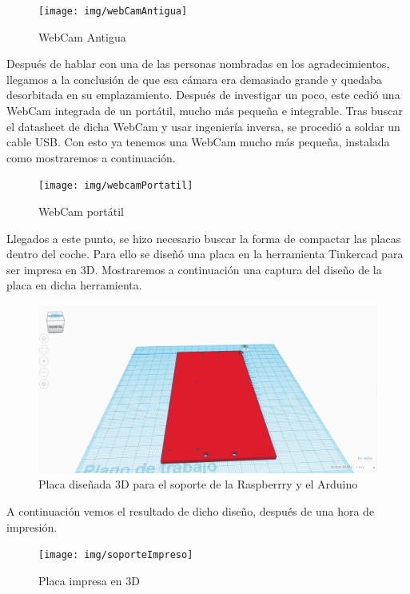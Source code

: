 \documentclass{pclass}
\begin{document}
\begin{itemize}
\begin{figure}[H]
	\centering
	\texttt{[image: img/webCamAntigua]}
	\caption{WebCam Antigua}
	\label{fig:webcamvieja}
\end{figure}

Después de hablar con una de las personas nombradas en los agradecimientos, llegamos a la conclusión de que esa cámara era demasiado grande y quedaba desorbitada en su emplazamiento. Después de investigar un poco, este cedió una WebCam integrada de un portátil, mucho más pequeña e integrable. Tras buscar el datasheet de dicha WebCam y usar ingeniería inversa, se procedió a soldar un cable USB. Con esto ya tenemos una WebCam mucho más pequeña, instalada como mostraremos a continuación.

\begin{figure}[H]
	\centering
	\texttt{[image: img/webcamPortatil]}
	\caption{WebCam portátil}
	\label{fig:webcamportatil}
\end{figure}

Llegados a este punto, se hizo necesario buscar la forma de compactar las placas dentro del coche. Para ello se diseñó una placa en la herramienta Tinkercad para ser impresa en 3D. Mostraremos a continuación una captura del diseño de la placa en dicha herramienta.

\begin{figure}[H]
	\centering
	\includegraphics[width=1\textwidth]{img/soportePlacas}
	\caption{Placa diseñada 3D para el soporte de la Raspberrry y el Arduino}
	\label{fig:soporteplacas}
\end{figure}

A continuación vemos el resultado de dicho diseño, después de una hora de impresión.

\begin{figure}[H]
	\centering
	\texttt{[image: img/soporteImpreso]}
	\caption{Placa impresa en 3D}
	\label{fig:soporteplacasimpreso}
\end{figure}


\end{itemize}
\end{document}
